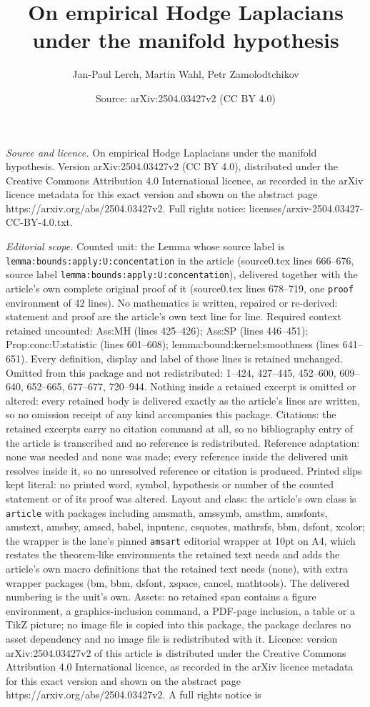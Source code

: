 \documentclass[10pt,a4paper]{amsart}
\title[On empirical Hodge Laplacians under the manifold hypothesis]{On empirical Hodge Laplacians under the manifold hypothesis}
\author{Jan-Paul Lerch, Martin Wahl, Petr Zamolodtchikov}
\date{Source: arXiv:2504.03427v2 (CC BY 4.0)}
\begin{document}
\maketitle

\noindent\emph{Source and licence.} On empirical Hodge Laplacians under the manifold hypothesis. Version arXiv:2504.03427v2 (CC BY 4.0), distributed under the Creative Commons Attribution 4.0 International licence, as recorded in the arXiv licence metadata for this exact version and shown on the abstract page https://arxiv.org/abs/2504.03427v2. Full rights notice: licenses/arxiv-2504.03427-CC-BY-4.0.txt.\par\smallskip

\noindent\textit{Editorial scope.} Counted unit: the Lemma whose source label is \texttt{lemma:bounds:apply:U:concentation} in the article (source0.tex lines 666--676, source label \texttt{lemma:bounds:apply:U:concentation}), delivered together with the article's own complete original proof of it (source0.tex lines 678--719, one \texttt{proof} environment of 42 lines). No mathematics is written, repaired or re-derived: statement and proof are the article's own text line for line. Required context retained uncounted: Ass:MH (lines 425--426); Ass:SP (lines 446--451); Prop:conc:U:statistic (lines 601--608); lemma:bound:kernel:smoothness (lines 641--651). Every definition, display and label of those lines is retained unchanged. Omitted from this package and not redistributed: 1--424, 427--445, 452--600, 609--640, 652--665, 677--677, 720--944. Nothing inside a retained excerpt is omitted or altered: every retained body is delivered exactly as the article's lines are written, so no omission receipt of any kind accompanies this package. Citations: the retained excerpts carry no citation command at all, so no bibliography entry of the article is transcribed and no reference is redistributed. Reference adaptation: none was needed and none was made; every reference inside the delivered unit resolves inside it, so no unresolved reference or citation is produced. Printed slips kept literal: no printed word, symbol, hypothesis or number of the counted statement or of its proof was altered. Layout and class: the article's own class is \texttt{article} with packages including amsmath, amssymb, amsthm, amsfonts, amstext, amsbsy, amscd, babel, inputenc, csquotes, mathrsfs, bbm, dsfont, xcolor; the wrapper is the lane's pinned \texttt{amsart} editorial wrapper at 10pt on A4, which restates the theorem-like environments the retained text needs and adds the article's own macro definitions that the retained text needs (none), with extra wrapper packages (bm, bbm, dsfont, xspace, cancel, mathtools). The delivered numbering is the unit's own. Assets: no retained span contains a figure environment, a graphics-inclusion command, a PDF-page inclusion, a table or a TikZ picture; no image file is copied into this package, the package declares no asset dependency and no image file is redistributed with it. Licence: version arXiv:2504.03427v2 of this article is distributed under the Creative Commons Attribution 4.0 International licence, as recorded in the arXiv licence metadata for this exact version and shown on the abstract page https://arxiv.org/abs/2504.03427v2. A full rights notice is 
\end{document}

